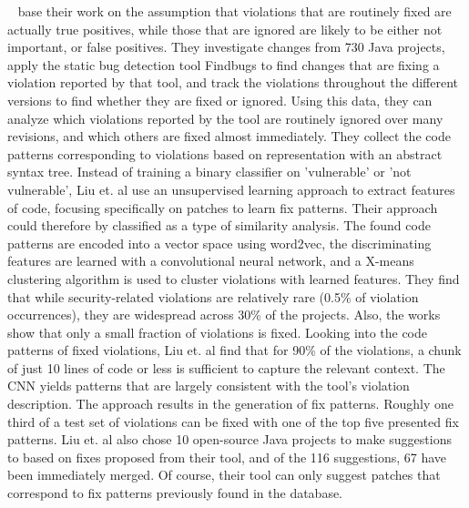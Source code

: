 \documentclass[
	a4paper,
	pagesize,
	pdftex,
	12pt,
	twoside, %
	BCOR=5mm, %
	ngerman,
	fleqn,
	final,
	]{scrartcl}
\begin{document}
~\cite{Liu.2018} base their work on the assumption that violations that are routinely fixed are actually true positives, while those that are ignored are likely to be either not important, or false positives. They investigate changes from 730 Java projects, apply the static bug detection tool Findbugs to find changes that are fixing a violation reported by that tool, and track the violations throughout the different versions to find whether they are fixed or ignored. Using this data, they can analyze which violations reported by the tool are routinely ignored over many revisions, and which others are fixed almost immediately. They collect the code patterns corresponding to violations based on representation with an abstract syntax tree. Instead of training a binary classifier on 'vulnerable' or 'not vulnerable', Liu et. al use an unsupervised learning approach to extract features of code, focusing specifically on patches to learn fix patterns. Their approach could therefore by classified as a type of similarity analysis. The found code patterns are encoded into a vector space using word2vec, the discriminating features are learned with a convolutional neural network, and a X-means clustering algorithm is used to cluster violations with learned features. They find that while security-related violations are relatively rare (0.5\% of violation occurrences), they are widespread across 30\% of the projects. Also, the works show that only a small fraction of violations is fixed. Looking into the code patterns of fixed violations, Liu et. al find that for 90\% of the violations, a chunk of just 10 lines of code or less is sufficient to capture the relevant context. The CNN yields patterns that are largely consistent with the tool's violation description. The approach results in the generation of fix patterns. Roughly one third of a test set of violations can be fixed with one of the top five presented fix patterns. Liu et. al also chose 10 open-source Java projects to make suggestions to based on fixes proposed from their tool, and of the 116 suggestions, 67 have been immediately merged. Of course, their tool can only suggest patches that correspond to fix patterns previously found in the database. \\
\end{document}
